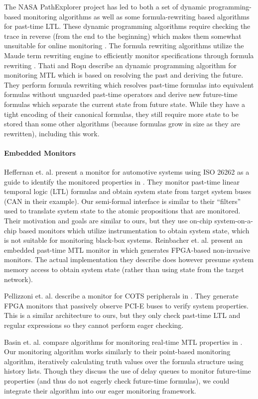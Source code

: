 The NASA PathExplorer project has led to both a set of dynamic programming-based monitoring algorithms as well as some formula-rewriting based algorithms \cite{Havelund2004} for past-time LTL. These dynamic programming algorithms require checking the trace in reverse (from the end to the beginning) which makes them somewhat unsuitable for online monitoring \cite{Havelund2002}. The formula rewriting algorithms utilize the Maude term rewriting engine to efficiently monitor specifications through formula rewriting \cite{Rosu2005}. 
%
Thati and Ro\c{s}u \cite{Thati2005} describe an dynamic programming algorithm for monitoring MTL which is based on resolving the past and deriving the future. They perform formula rewriting which resolves past-time formulas into equivalent formulas without unguarded past-time operators and derive new future-time formulas which separate the current state from future state. 
While they have a tight encoding of their canonical formulas, they still require more state to be stored than some other algorithms (because formulas grow in size as they are rewritten), including this work.


\paragraph{Embedded Monitors}
Heffernan et. al. present a monitor for automotive systems using ISO 26262 as a guide to identify the monitored properties in \cite{Heffernan2014}. They monitor past-time linear temporal logic (LTL) formulas and obtain system state from target system buses (CAN in their example). Our semi-formal interface is similar to their ``filters'' used to translate system state to the atomic propositions that are monitored. Their motivation and goals are similar to ours, but they use on-chip system-on-a-chip based monitors which utilize instrumentation to obtain system state, which is not suitable for monitoring black-box systems.
Reinbacher et. al. present an embedded past-time MTL monitor in \cite{Reinbacher2013} which generates FPGA-based non-invasive monitors. 
The actual implementation they describe does however presume system memory access to obtain system state (rather than using state from the target network).

Pellizzoni et. al. describe a monitor for COTS peripherals in \cite{Pellizzoni2008}. They generate FPGA monitors that passively observe PCI-E buses to verify system properties. This is a similar architecture to ours, but they only check past-time LTL and regular expressions so they cannot perform eager checking.

Basin et. al. compare algorithms for monitoring real-time MTL properties in \cite{Basin2012}. Our monitoring algorithm works similarly to their point-based monitoring algorithm, iteratively calculating truth values over the formula structure using history lists. Though they discuss the use of delay queues to monitor future-time properties (and thus do not eagerly check future-time formulas), we could integrate their algorithm into our eager monitoring framework.
